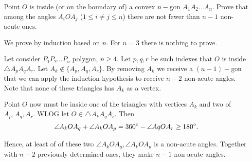 \documentclass{article}
\begin{document}
\begin{problem}
    Point $O$ is inside (or on the boundary of) a convex $n-$gon $A_1 A_2 \ldots A_n.$
    Prove that among the angles $A_i O A_j$ ($1\le i \ne j \le n$) there are not fewer than $n-1$ non-acute ones.
\end{problem}

\begin{soln}
    We prove by induction based on $n$. For $n=3$ there is nothing to prove.

    Let consider $P_1P_2 \ldots P_n$ polygon, $n\ge 4.$ Let $p,q,r$ be such indexes that $O$ is inside $\triangle A_p A_q A_r.$
    Let $A_k \not \in \{ A_p, A_q, A_r \}.$
    By removing $A_k$ we receive a $(n-1)-$gon that we can apply the induction hypothesis to receive $n-2$ non-acute angles.
    Note that none of these triangles has $A_k$ as a vertex.

    Point $O$ now must be inside one of the triangles with vertices $A_k$ and two of $A_p, A_q, A_r.$
    WLOG let $O \in \triangle A_k A_q A_r.$ Then
    \[
        \angle A_k O A_q + \angle A_k O A_p = 360^\circ - \angle Aq O A_r \ge 180 ^\circ.
    \]

    Hence, at least of of these two $\angle A_k O A_q, \angle A_k O A_p$ is a non-acute angles. Together with $n-2$ previously determined ones,
    they make $n-1$ non-acute angles.
\end{soln}
\end{document}
